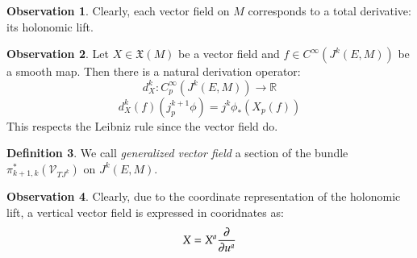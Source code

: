 \documentclass[12pt,a4paper]{report}
\theoremstyle{definition}
\newtheorem{Def}{Definition}[chapter]
\theoremstyle{Theorem}
\theoremstyle{break}
\theoremstyle{definition}
\newtheorem{Obs}[Def]{Observation}
\begin{document}
		\begin{Obs}
			Clearly, each vector field on $M$ corresponds to a total derivative: its holonomic lift.
		\end{Obs}
		\begin{Obs}
			Let $X\in\mathfrak{X}(M)$ be a vector field and $f\in C^\infty(J^k(E,M))$ be a smooth map. Then there is a natural derivation operator:
			$$d^k_X:C^\infty_p(J^k(E,M))\rightarrow\mathbb{R}$$
			$$d^k_X(f)(j^{k+1}_p\phi)=j^k\phi_*(X_p(f))$$
			This respects the Leibniz rule since the vector field do.
		\end{Obs}
		\begin{Def}
			We call \textit{generalized vector field} a section of the bundle $\pi_{k+1,k}^*(\mathcal{V}_{TJ^k})$ on $J^k(E,M)$.
		\end{Def}
		\begin{Obs}
			Clearly, due to the coordinate representation of the holonomic lift, a vertical vector field is expressed in cooridnates as:
			$$X=X^a{\partial\over \partial u^a}$$
		\end{Obs}
\end{document}
